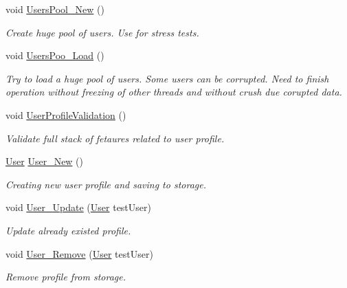 \begin{DoxyCompactItemize}
void \mbox{\hyperlink{class_authority_controller_1_1_tests_1_1_data_a770588d92222eb045fcd482646e44c9f}{Users\+Pool\+\_\+\+New}} ()
\begin{DoxyCompactList}\small\item\em Create huge pool of users. Use for stress tests. \end{DoxyCompactList}\item 
void \mbox{\hyperlink{class_authority_controller_1_1_tests_1_1_data_aa66213692c59f2aef176b51dc7df7972}{Users\+Poo\+\_\+\+Load}} ()
\begin{DoxyCompactList}\small\item\em Try to load a huge pool of users. Some users can be corrupted. Need to finish operation without freezing of other threads and without crush due corupted data. \end{DoxyCompactList}\item 
void \mbox{\hyperlink{class_authority_controller_1_1_tests_1_1_data_ae113be915fe80272e4a44c1349055ef5}{User\+Profile\+Validation}} ()
\begin{DoxyCompactList}\small\item\em Validate full stack of fetaures related to user profile. \end{DoxyCompactList}\item 
\mbox{\hyperlink{class_authority_controller_1_1_data_1_1_user}{User}} \mbox{\hyperlink{class_authority_controller_1_1_tests_1_1_data_a4f32d71ba5cc02b5b97336890441908a}{User\+\_\+\+New}} ()
\begin{DoxyCompactList}\small\item\em Creating new user profile and saving to storage. \end{DoxyCompactList}\item 
void \mbox{\hyperlink{class_authority_controller_1_1_tests_1_1_data_ad48945ccc2bf1ba76b3b4697c291f962}{User\+\_\+\+Update}} (\mbox{\hyperlink{class_authority_controller_1_1_data_1_1_user}{User}} test\+User)
\begin{DoxyCompactList}\small\item\em Update already existed profile. \end{DoxyCompactList}\item 
void \mbox{\hyperlink{class_authority_controller_1_1_tests_1_1_data_a722e102c8ac10de91863739d1f911ccc}{User\+\_\+\+Remove}} (\mbox{\hyperlink{class_authority_controller_1_1_data_1_1_user}{User}} test\+User)
\begin{DoxyCompactList}\small\item\em Remove profile from storage. \end{DoxyCompactList}\item 

\end{DoxyCompactItemize}
